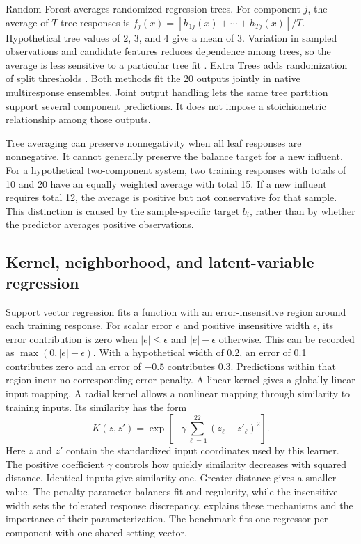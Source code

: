 Random Forest averages randomized regression trees. For component $j$, the average of $T$ tree responses is $f_j(x)=[h_{1j}(x)+\cdots+h_{Tj}(x)]/T$. Hypothetical tree values of 2, 3, and 4 give a mean of 3. Variation in sampled observations and candidate features reduces dependence among trees, so the average is less sensitive to a particular tree fit \citep{Breiman2001}. Extra Trees adds randomization of split thresholds \citep{Geurts2006}. Both methods fit the 20 outputs jointly in native multiresponse ensembles. Joint output handling lets the same tree partition support several component predictions. It does not impose a stoichiometric relationship among those outputs.

Tree averaging can preserve nonnegativity when all leaf responses are nonnegative. It cannot generally preserve the balance target for a new influent. For a hypothetical two-component system, two training responses with totals of 10 and 20 have an equally weighted average with total 15. If a new influent requires total 12, the average is positive but not conservative for that sample. This distinction is caused by the sample-specific target $b_i$, rather than by whether the predictor averages positive observations.

\subsection{Kernel, neighborhood, and latent-variable regression}

Support vector regression fits a function with an error-insensitive region around each training response. For scalar error $e$ and positive insensitive width $\epsilon$, its error contribution is zero when $|e|\leq\epsilon$ and $|e|-\epsilon$ otherwise. This can be recorded as $\max(0,|e|-\epsilon)$. With a hypothetical width of 0.2, an error of 0.1 contributes zero and an error of $-0.5$ contributes 0.3. Predictions within that region incur no corresponding error penalty. A linear kernel gives a globally linear input mapping. A radial kernel allows a nonlinear mapping through similarity to training inputs. Its similarity has the form
\[
K(z,z')=\exp\!\left[-\gamma\sum_{\ell=1}^{22}(z_\ell-z'_\ell)^2\right].
\]
Here $z$ and $z'$ contain the standardized input coordinates used by this learner. The positive coefficient $\gamma$ controls how quickly similarity decreases with squared distance. Identical inputs give similarity one. Greater distance gives a smaller value. The penalty parameter balances fit and regularity, while the insensitive width sets the tolerated response discrepancy. \citet{SmolaScholkopf2004} explains these mechanisms and the importance of their parameterization. The benchmark fits one regressor per component with one shared setting vector.

